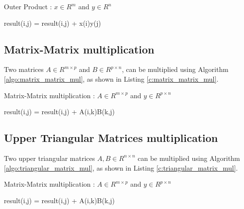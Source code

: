 \begin{algorithm}
	\caption{Outer Product : $x \in {R^m}$ and $y \in {R^n}$}
	\label{algo:outer_product}
	\begin{algorithmic}[1]
				\State result(i,j) = result(i,j) + x(i)y(j)
			\EndFor
		\EndFor
	\end{algorithmic}
\end{algorithm}



\subsection{Matrix-Matrix multiplication}
Two matrices $A \in {R^{m \times p}}$ and $B \in {R^{p \times n}}$, can be multiplied using Algorithm \ref{algo:matrix_matrix_mul}, as shown in Listing \ref{c:matrix_matrix_mul}. 

\begin{algorithm}
	\caption{Matrix-Matrix multiplication : $A \in {R^{m \times p}}$ and $y \in {R^{p \times n}}$}
	\label{algo:matrix_matrix_mul}
	\begin{algorithmic}[1]
					\State result(i,j) = result(i,j) + A(i,k)B(k,j)
				\EndFor
			\EndFor
		\EndFor
	\end{algorithmic}
\end{algorithm}



\subsection{Upper Triangular Matrices multiplication}
Two upper triangular matrices $A, B \in {R^{n \times n}}$ can be multiplied using Algorithm \ref{algo:triangular_matrix_mul}, as shown in Listing \ref{c:triangular_matrix_mul}.
\begin{algorithm}
	\caption{Matrix-Matrix multiplication : $A \in {R^{m \times p}}$ and $y \in {R^{p \times n}}$}
	\label{algo:triangular_matrix_mul}
	\begin{algorithmic}[1]
					\State result(i,j) = result(i,j) + A(i,k)B(k,j)
				\EndFor
			\EndFor
		\EndFor
	\end{algorithmic}
\end{algorithm}

